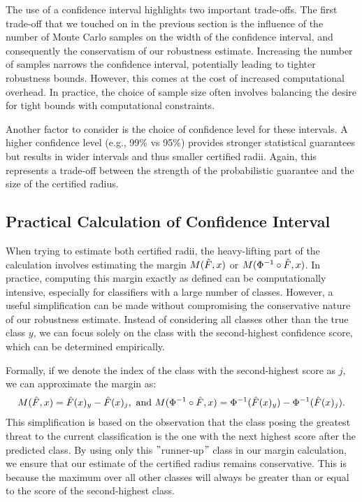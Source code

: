 The use of a confidence interval highlights two important trade-offs.
The first trade-off that we touched on in the previous section is the influence of the number of Monte Carlo samples on the width of the confidence interval, and consequently the conservatism of our robustness estimate.
Increasing the number of samples narrows the confidence interval, potentially leading to tighter robustness bounds.
However, this comes at the cost of increased computational overhead.
In practice, the choice of sample size often involves balancing the desire for tight bounds with computational constraints.

Another factor to consider is the choice of confidence level for these intervals.
A higher confidence level (e.g., 99\% vs 95\%) provides stronger statistical guarantees but results in wider intervals and thus smaller certified radii.
Again, this represents a trade-off between the strength of the probabilistic guarantee and the size of the certified radius.

\subsection{Practical Calculation of Confidence Interval}\label{subsec:practical-calculation-of-confidence-interval}

When trying to estimate both certified radii, the heavy-lifting part of the calculation involves estimating the margin $M(\Hat{F},x)$ or $M(\Phi^{-1}\circ\Hat{F},x)$.
In practice, computing this margin exactly as defined can be computationally intensive, especially for classifiers with a large number of classes.
However, a useful simplification can be made without compromising the conservative nature of our robustness estimate.
Instead of considering all classes other than the true class $y$, we can focus solely on the class with the second-highest confidence score, which can be determined empirically.

Formally, if we denote the index of the class with the second-highest score as $j$, we can approximate the margin as:
\begin{align*}
    M(\Hat{F},x) =\Hat{F}(x)_{y} - \Hat{F}(x)_j, \text{ and }M(\Phi^{-1}\circ\Hat{F},x) =\Phi^{-1}(\Hat{F}(x)_{y}) - \Phi^{-1}(\Hat{F}(x)_j).
\end{align*}
This simplification is based on the observation that the class posing the greatest threat to the current classification is the one with the next highest score after the predicted class.
By using only this \("\)runner-up\("\) class in our margin calculation, we ensure that our estimate of the certified radius remains conservative.
This is because the maximum over all other classes will always be greater than or equal to the score of the second-highest class.

